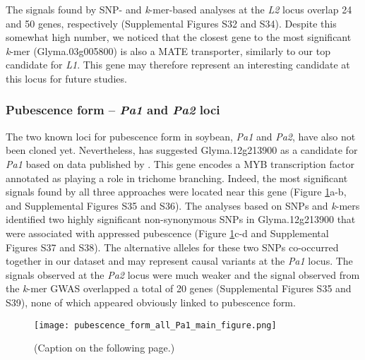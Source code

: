 \documentclass{article}
\begin{document}
The signals found by SNP- and \emph{k}-mer-based analyses at the \textit{L2}
locus overlap 24 and 50 genes, respectively (Supplemental Figures
S32 and S34). Despite this
somewhat high number, we noticed that the closest gene to the most significant
\emph{k}-mer (Glyma.03g005800) is also a MATE transporter, similarly to our top
candidate for \emph{L1}. This gene may therefore represent an interesting
candidate at this locus for future studies.

\subsubsection*{Pubescence form -- \textit{Pa1} and \textit{Pa2} loci}
\label{sv-gwas-main-results-pubescence-form-pa1-pa2}

The two known loci for pubescence form in soybean, \textit{Pa1} and
\textit{Pa2}, have also not been cloned yet. Nevertheless, 
has suggested Glyma.12g213900 as a candidate for \textit{Pa1} based on data
published by . This gene encodes a MYB transcription factor
annotated as playing a role in trichome branching. Indeed, the most significant
signals found by all three approaches were located near this gene (Figure
\ref{pubescence-form-main-figure}a-b, and Supplemental Figures S35 and
S36).  The analyses based on SNPs and
\emph{k}-mers identified two highly significant non-synonymous SNPs in
Glyma.12g213900 that were associated with appressed pubescence (Figure
\ref{pubescence-form-main-figure}c-d and Supplemental Figures S37 and
S38). The alternative alleles for these two
SNPs co-occurred together in our dataset and may represent causal variants at
the \emph{Pa1} locus. The signals observed at the \emph{Pa2} locus were much
weaker and the signal observed from the \emph{k}-mer GWAS overlapped a total of
20 genes (Supplemental Figures S35 and
S39), none of which appeared obviously linked
to pubescence form.

\begin{figure}
	\centering
	\texttt{[image: pubescence\_form\_all\_Pa1\_main\_figure.png]}
	\caption{(Caption on the following page.)}
	\label{pubescence-form-main-figure}
\end{figure}
\end{document}
